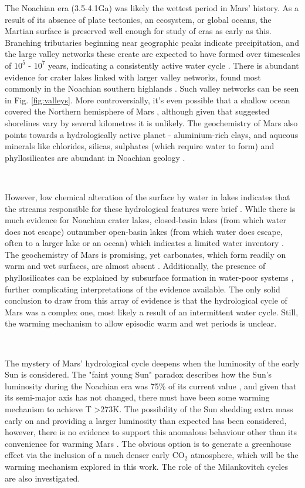 \documentclass[12pt,onecolumn]{revtex4-2}    %
\begin{document}
The Noachian era (3.5-4.1Ga) was likely the wettest period in Mars' history. As a result of its absence of plate tectonics, an ecosystem, or global oceans, the Martian surface is preserved well enough for study of eras as early as this. Branching tributaries beginning near geographic peaks indicate precipitation, and the large valley networks these create are expected to have formed over timescales of $10^{5}$ - $10^{7}$ years, indicating a consistently active water cycle \cite{W16}. There is abundant evidence for crater lakes linked with larger valley networks, found most commonly in the Noachian southern highlands \cite{FH08}. Such valley networks can be seen in Fig. \ref{fig:valleys}. More controversially, it's even possible that a shallow ocean covered the Northern hemisphere of Mars \cite{H99}, although given that suggested shorelines vary by several kilometres it is unlikely. The geochemistry of Mars also points towards a hydrologically active planet - aluminium-rich clays, and aqueous minerals like chlorides, silicas, sulphates (which require water to form) and phyllosilicates are abundant in Noachian geology \cite{EE14}. 

\

However, low chemical alteration of the surface by water in lakes indicates that the streams responsible for these hydrological features were brief \cite{W13}. While there is much evidence for Noachian crater lakes, closed-basin lakes (from which water does not escape) outnumber open-basin lakes (from which water does escape, often to a larger lake or an ocean) which indicates a limited water inventory \cite{BHM09}. The geochemistry of Mars is promising, yet carbonates, which form readily on warm and wet surfaces, are almost absent \cite{C13} \cite{EE14}. Additionally, the presence of phyllosilicates can be explained by subsurface formation in water-poor systems \cite{E11}, further complicating interpretations of the evidence available. The only solid conclusion to draw from this array of evidence is that the hydrological cycle of Mars was a complex one, most likely a result of an intermittent water cycle. Still, the warming mechanism to allow episodic warm and wet periods is unclear.

\

The mystery of Mars' hydrological cycle deepens when the luminosity of the early Sun is considered. The "faint young Sun" paradox describes how the Sun's luminosity during the Noachian era was 75\% of its current value \cite{G81}, and given that its semi-major axis has not changed, there must have been some warming mechanism to achieve T \textgreater 273K. The possibility of the Sun shedding extra mass early on and providing a larger luminosity than expected has been considered, however, there is no evidence to support this anomalous behaviour other than its convenience for warming Mars \cite{MM07}. The obvious option is to generate a greenhouse effect via the inclusion of a much denser early $\mathrm{CO_2}$ atmosphere, which will be the warming mechanism explored in this work. The role of the Milankovitch cycles are also investigated.
\end{document}

